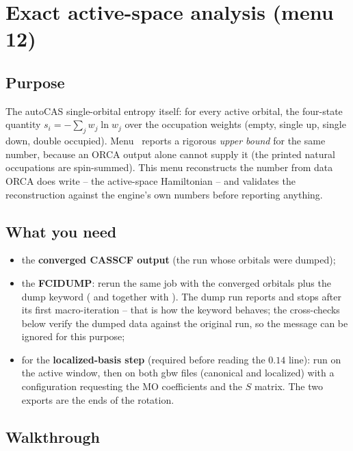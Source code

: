 \chapter{Exact active-space analysis (menu 12)}
\label{ch:menu12}

\section{Purpose}

The autoCAS single-orbital entropy itself: for every active orbital, the
four-state quantity $s_i = -\sum_j w_j \ln w_j$ over the occupation weights
(empty, single up, single down, double occupied). Menu~ reports a
rigorous \emph{upper bound} for the same number, because an ORCA output alone
cannot supply it (the printed natural occupations are spin-summed). This menu
reconstructs the number from data ORCA does write -- the active-space
Hamiltonian -- and validates the reconstruction against the engine's own
numbers before reporting anything.

\section{What you need}

\begin{itemize}
  \item the \textbf{converged CASSCF output} (the run whose orbitals were
    dumped);
  \item the \textbf{FCIDUMP}: rerun the same job with the converged orbitals
    plus the dump keyword
    ( and  together with
    ). The dump run reports  and
    stops after its first macro-iteration -- that is how the keyword behaves;
    the cross-checks below verify the dumped data against the original run, so
    the message can be ignored for this purpose;
  \item for the \textbf{localized-basis step} (required before reading the
    $0.14$ line): run  on the active window, then
     on both gbw files (canonical and localized) with a
    configuration requesting the MO coefficients and the $S$ matrix. The two
    exports are the ends of the rotation.
\end{itemize}

\section{Walkthrough}

